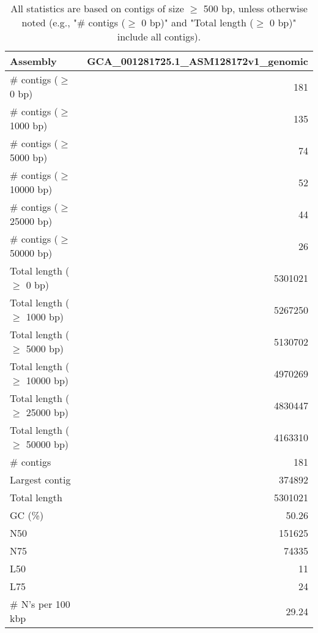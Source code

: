 \documentclass[12pt,a4paper]{article}
\begin{document}
\begin{table}[ht]
\begin{center}
\caption{All statistics are based on contigs of size $\geq$ 500 bp, unless otherwise noted (e.g., "\# contigs ($\geq$ 0 bp)" and "Total length ($\geq$ 0 bp)" include all contigs).}
\begin{tabular}{|l*{1}{|r}|}
\hline
Assembly & GCA\_001281725.1\_ASM128172v1\_genomic \\ \hline
\# contigs ($\geq$ 0 bp) & 181 \\ \hline
\# contigs ($\geq$ 1000 bp) & 135 \\ \hline
\# contigs ($\geq$ 5000 bp) & 74 \\ \hline
\# contigs ($\geq$ 10000 bp) & 52 \\ \hline
\# contigs ($\geq$ 25000 bp) & 44 \\ \hline
\# contigs ($\geq$ 50000 bp) & 26 \\ \hline
Total length ($\geq$ 0 bp) & 5301021 \\ \hline
Total length ($\geq$ 1000 bp) & 5267250 \\ \hline
Total length ($\geq$ 5000 bp) & 5130702 \\ \hline
Total length ($\geq$ 10000 bp) & 4970269 \\ \hline
Total length ($\geq$ 25000 bp) & 4830447 \\ \hline
Total length ($\geq$ 50000 bp) & 4163310 \\ \hline
\# contigs & 181 \\ \hline
Largest contig & 374892 \\ \hline
Total length & 5301021 \\ \hline
GC (\%) & 50.26 \\ \hline
N50 & 151625 \\ \hline
N75 & 74335 \\ \hline
L50 & 11 \\ \hline
L75 & 24 \\ \hline
\# N's per 100 kbp & 29.24 \\ \hline
\end{tabular}
\end{center}
\end{table}
\end{document}
